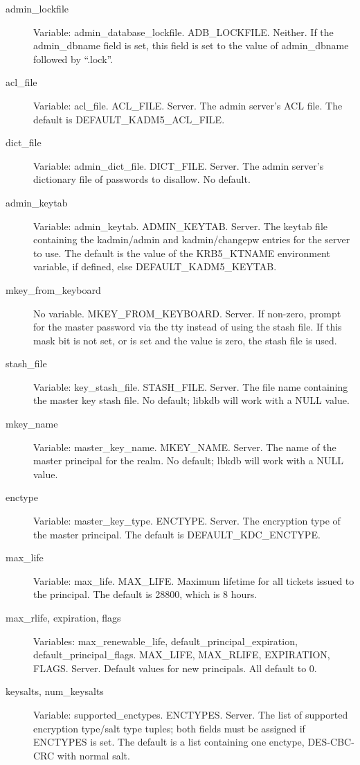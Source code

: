 \begin{description}
\item[admin_lockfile] Variable: admin_database_lockfile.
ADB_LOCKFILE.  Neither.  If the admin_dbname field is set, this field
is set to the value of admin_dbname followed by ``.lock''.

\item[acl_file] Variable: acl_file.  ACL_FILE.  Server.  The admin
server's ACL file.  The default is DEFAULT_KADM5_ACL_FILE.

\item[dict_file] Variable: admin_dict_file.  DICT_FILE.  Server.  The
admin server's dictionary file of passwords to disallow.  No default.

\item[admin_keytab] Variable: admin_keytab. ADMIN_KEYTAB.  Server.
The keytab file containing the kadmin/admin and kadmin/changepw
entries for the server to use.  The default is the value of the
KRB5_KTNAME environment variable, if defined, else
DEFAULT_KADM5_KEYTAB.

\item[mkey_from_keyboard] No variable. MKEY_FROM_KEYBOARD.  Server.
If non-zero, prompt for the master password via the tty instead of
using the stash file.  If this mask bit is not set, or is set and the
value is zero, the stash file is used.

\item[stash_file] Variable: key_stash_file.  STASH_FILE. Server.  The
file name containing the master key stash file.  No default; libkdb
will work with a NULL value.

\item[mkey_name] Variable: master_key_name.  MKEY_NAME.  Server.  The
name of the master principal for the realm.  No default; lbkdb will
work with a NULL value.

\item[enctype] Variable: master_key_type.  ENCTYPE.  Server.  The
encryption type of the master principal.  The default is
DEFAULT_KDC_ENCTYPE.

\item[max_life] Variable: max_life.  MAX_LIFE.  Maximum lifetime for
all tickets issued to the principal.  The default is 28800, which is 8
hours.

\item[max_rlife, expiration, flags] Variables: max_renewable_life,
default_principal_expiration, default_principal_flags.  MAX_LIFE,
MAX_RLIFE, EXPIRATION, FLAGS.  Server.  Default values for new
principals.  All default to 0.

\item[keysalts, num_keysalts] Variable: supported_enctypes.  ENCTYPES.
Server.  The list of supported encryption type/salt type tuples; both
fields must be assigned if ENCTYPES is set.  The default is a list
containing one enctype, DES-CBC-CRC with normal salt.
\end{description}

